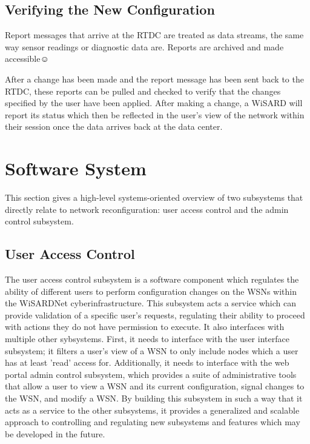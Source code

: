 \subsection{Verifying the New Configuration}
Report messages that arrive at the RTDC are treated as data streams, the same way sensor readings or diagnostic data are. Reports are archived and made accessible☺

After a change has been made and the report message has been sent back to the RTDC, these reports can be pulled and checked to verify that the changes specified by the user have been applied. After making a change, a WiSARD will report its status which then be reflected in the user's view of the network within their session once the data arrives back at the data center.

\section {Software System}

This section gives a high-level systems-oriented overview of two subsystems that directly relate to network reconfiguration: user access control and the admin control subsystem.

\subsection{User Access Control}
The user access control subsystem is a software component which regulates the ability of different users to perform configuration changes on the WSNs within the WiSARDNet cyberinfrastructure. This subsystem acts a service which can provide validation of a specific user's requests, regulating their ability to proceed with actions they do not have permission to execute. It also interfaces with multiple other sybsystems. First, it needs to interface with the user interface subsystem; it filters a user's view of a WSN to only include nodes which a user has at least 'read' access for. Additionally, it needs to interface with the web portal admin control subsystem, which provides a suite of administrative tools that allow a user to view a WSN and its current configuration, signal changes to the WSN, and modify a WSN. By building this subsystem in such a way that it acts as a service to the other subsystems, it provides a generalized and scalable approach to controlling and regulating new subsystems and features which may be developed in the future. 

